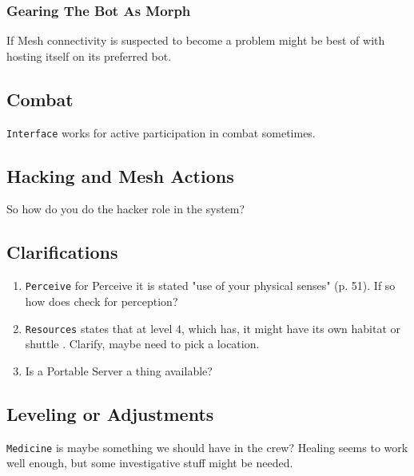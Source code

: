\subsubsection{Gearing The Bot As Morph}

If \gls{Mesh} connectivity is suspected to become a problem \texttt{\egr{}}\index{\egr{}} might be best of with hosting itself on its preferred bot.


\subsection{Combat}

\texttt{Interface} works for active participation in combat sometimes.  \citep[p. 50]{ep2e_1.1_2019}


\subsection{Hacking and Mesh Actions}

So how do you do the hacker role in the system?


\subsection{Clarifications}

\begin{enumerate}
    \item \texttt{Perceive}  for Perceive it is stated "use of your physical senses" (p. 51). If so how does \egr{} check for perception?

    \item \texttt{Resources} states that at level 4, which \egr{} has, it might have its own habitat or shuttle \citep[p. 75]{ep2e_1.1_2019}. Clarify, maybe need to pick a location.

    \item Is a Portable Server a thing available?
\end{enumerate}

\subsection{Leveling or Adjustments}

\texttt{Medicine} is maybe something we should have in the crew? Healing seems to work well enough, but some investigative stuff might be needed.

